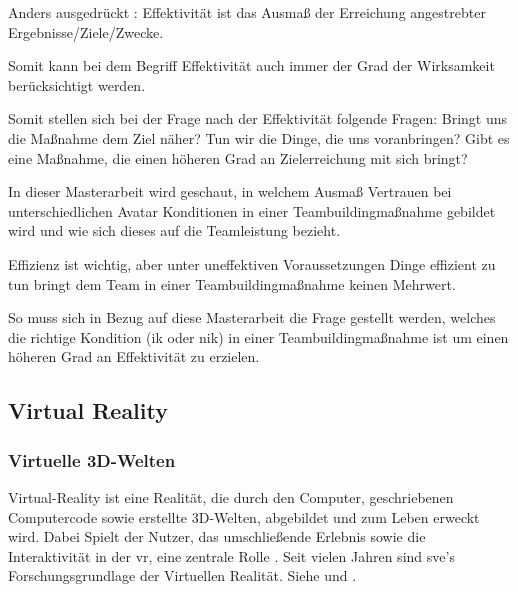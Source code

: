 \documentclass[a4paper,11pt]{article}%
\renewcommand{\\}{\vspace*{0.5\baselineskip} \newline}
\begin{document}
Anders ausgedrückt : Effektivität ist das Ausmaß der Erreichung angestrebter Ergebnisse/Ziele/Zwecke.

Somit kann bei dem Begriff \dq{}Effektivität\dq{} auch immer der Grad der Wirksamkeit berücksichtigt werden.

Somit stellen sich bei der Frage nach der Effektivität folgende Fragen: 
Bringt uns die Maßnahme dem Ziel näher? 
Tun wir die Dinge, die uns voranbringen?
Gibt es eine Maßnahme, die einen höheren Grad an Zielerreichung mit sich bringt?

In dieser Masterarbeit wird geschaut, in welchem Ausmaß Vertrauen bei unterschiedlichen Avatar Konditionen in einer Teambuildingmaßnahme gebildet wird und wie sich dieses auf die Teamleistung bezieht.

Effizienz ist wichtig, aber unter uneffektiven Voraussetzungen Dinge effizient zu tun bringt dem Team in einer Teambuildingmaßnahme keinen Mehrwert.

So muss sich in Bezug auf diese Masterarbeit die Frage gestellt werden, welches die richtige Kondition (\ac{ik} oder \ac{nik}) in einer Teambuildingmaßnahme ist um einen höheren Grad an Effektivität zu erzielen.
	\subsection{Virtual Reality}
	\label{Virtual Reality}
		\subsubsection{Virtuelle 3D-Welten}
Virtual-Reality ist eine Realität, die durch den Computer, geschriebenen Computercode sowie erstellte 3D-Welten, abgebildet und zum Leben erweckt wird. Dabei Spielt der Nutzer, das umschließende Erlebnis sowie die Interaktivität in der \ac{vr}, eine zentrale Rolle \citep[p.6-12]{sherman2018understanding}.
	Seit vielen Jahren sind \ac{sve}'s Forschungsgrundlage der Virtuellen Realität. Siehe \citep{shuffler2011there} \citep{steed1999leadership} und \citep{de2011level}.
\end{document}
